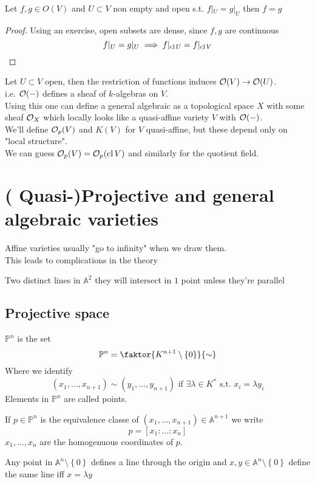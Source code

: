 \documentclass[../main.tex]{subfiles}
\begin{document}
\begin{crly}
Let $f,g\in O( V) $ and $U \subset V$ non empty and open s.t. $f|_U= g|_U$ then $f=g$ 
\end{crly}
\begin{proof}
Using an exercise, open subsets are dense, since $f,g$ are continuous
\[ 
f|_U = g|_U \implies f|_{ \operatorname{cl} U} = f|_{ \operatorname{cl} V} 
\]

\end{proof}
\begin{rmq}
Let $U \subset V$ open, then the restriction of functions induces $\mathcal{O}( V) \to \mathcal{O}( U) $.\\
i.e. $\mathcal{O}( -) $ defines a sheaf of $k$-algebras on $V$.\\
Using this one can define a general algebraic as a topological space $X$ with some sheaf $\mathcal{O}_X$ which locally looks like a quasi-affine variety $V$ with $\mathcal{O}( -) $.\\
We'll define $\mathcal{O}_p( V) $ and $K( V) $ for $V$ quasi-affine, but these depend only on "local structure".\\
We can guess $\mathcal{O}_p( V) = \mathcal{O}_p( \operatorname{cl} V) $ and similarly for the quotient field.
\end{rmq}
\section{( Quasi-)Projective and general algebraic varieties}
Affine varieties usually "go to infinity" when we draw them.\\
This leads to complications in the theory
\begin{exemple}
Two distinct lines in $ \mathbb{A}^{2}$ they will intersect in $1$ point unless they're parallel
\end{exemple}
\subsection{Projective space}
\begin{defn}
$\mathbb{P}^{n}$ is the set 
\[ 
	\mathbb{P}^{n} = \faktor { K^{n+1}\setminus \left\{ 0 \right\} } { \sim} 
\]
Where we identify 
\[ 
	( x_1,\ldots, x_{n+1} ) \sim ( y_1,\ldots, y_{n+1} ) \text{ if  } \exists \lambda \in K^{\ast} \text{ s.t. } x_i = \lambda y_i
\]
Elements in $ \mathbb{P}^n$ 	are called points.
\end{defn}
If $p\in \mathbb{P}^{n}$ is the equivalence classe of $ ( x_1,\ldots, x_{n+1} )\in \mathbb{A}^{n+1} $ we write
\[ 
p = [ x_1:\ldots:x_n] 
\]
$x_1,\ldots, x_n$ are the homogenuous coordinates of $p$.
\begin{rmq}
Any point in $ \mathbb{A}^{n}\setminus \left\{ 0 \right\} $ defines a line through the origin and $x,y\in \mathbb{A}^{n}\setminus \left\{ 0 \right\} $ define the same line iff $x=\lambda y$ 
\end{rmq}

	

	
\end{document}
